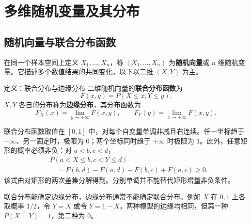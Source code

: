\documentclass[UTF8,fontset=none,zihao=-4,a4paper]{ctexart}
\newcommand{\term}[1]{\textbf{#1}}
\newcommand{\chapterpage}[1]{\clearpage\section{#1}}
\begin{document}
\chapterpage{多维随机变量及其分布}
\subsection{随机向量与联合分布函数}
在同一个样本空间上定义 $X_1,\ldots,X_n$，称 $(X_1,\ldots,X_n)$ 为\term{随机向量}或 $n$ 维随机变量。它描述多个数值结果的共同变化。以下以二维 $(X,Y)$ 为主。
\begin{infobox}{定义：联合分布与边缘分布}
二维随机向量的\term{联合分布函数}为
\[
F(x,y)=P(X\le x,Y\le y).
\]
$X,Y$ 各自的分布称为\term{边缘分布}，其分布函数为
\[
F_X(x)=\lim_{y\to+\infty}F(x,y),\qquad
F_Y(y)=\lim_{x\to+\infty}F(x,y).
\]
\end{infobox}
联合分布函数取值在 $[0,1]$ 中，对每个自变量单调非减且右连续。任一坐标趋于 $-\infty$、另一固定时，极限为 $0$；两个坐标同时趋于 $+\infty$ 时极限为 $1$。此外，任意矩形的概率必须非负：对 $a<b,c<d$，
\begin{align*}
&P(a<X\le b,c<Y\le d)\\
&\quad=F(b,d)-F(a,d)-F(b,c)+F(a,c)\ge0.
\end{align*}
该式由对矩形的两次差集分解得到。分别单调并不能替代矩形增量非负条件。

联合分布能确定边缘分布，边缘分布通常不能确定联合分布。例如 $X$ 在 $0,1$ 上各取概率 $1/2$，令 $Y=X$ 或令 $Y=1-X$，两种模型的边缘均相同，但第一种 $P(X=Y)=1$，第二种为 $0$。
\end{document}
